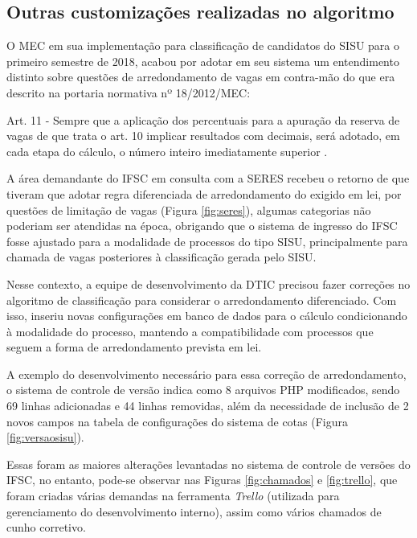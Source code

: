 \subsection{Outras customizações realizadas no algoritmo}
\label{outrasVersoes}

O \gls{MEC} em sua implementação para classificação de candidatos do \gls{SISU} para o primeiro semestre de 2018, acabou por adotar em seu sistema um entendimento distinto sobre questões de arredondamento de vagas em contra-mão do que era descrito na portaria normativa nº 18/2012/MEC:

\begin{citacao}
Art. 11 - Sempre que a aplicação dos percentuais para a apuração da reserva de vagas de que trata o art. 10 implicar resultados com decimais, será adotado, em cada etapa do cálculo, o número inteiro imediatamente superior \cite{portarianr9}.
\end{citacao}



\newpage
A área demandante do \gls{IFSC} em consulta com a \gls{SERES} recebeu o retorno de que tiveram que adotar regra diferenciada de arredondamento do exigido em lei, por questões de limitação de vagas (Figura \ref{fig:seres}), algumas categorias não poderiam ser atendidas na época, obrigando que o sistema de ingresso do \gls{IFSC} fosse ajustado para a modalidade de processos do tipo \gls{SISU}, principalmente para chamada de vagas posteriores à classificação gerada pelo \gls{SISU}.

Nesse contexto, a equipe de desenvolvimento da \gls{DTIC} precisou fazer correções no algoritmo de classificação para considerar o arredondamento diferenciado. Com isso, inseriu novas configurações em banco de dados para o cálculo condicionando à modalidade do processo, mantendo a compatibilidade com processos que seguem a forma de arredondamento prevista em lei.

A exemplo do desenvolvimento necessário para essa correção de arredondamento, o sistema de controle de versão indica como 8 arquivos PHP modificados, sendo 69 linhas adicionadas e 44 linhas removidas, além da necessidade de inclusão de 2 novos campos na tabela de configurações do sistema de cotas (Figura \ref{fig:versaosisu}).



\newpage
Essas foram as maiores alterações levantadas no sistema de controle de versões do \gls{IFSC}, no entanto, pode-se observar nas Figuras \ref{fig:chamados} e \ref{fig:trello}, que foram criadas várias demandas na ferramenta \textit{Trello} (utilizada para gerenciamento do desenvolvimento interno), assim como vários chamados de cunho corretivo.  

